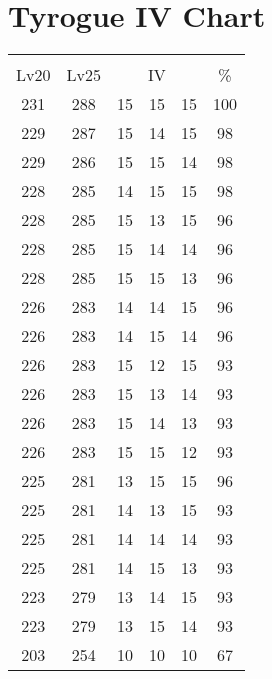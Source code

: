 \documentclass{article}%
\begin{document}
%
\normalsize%
\section{Tyrogue IV Chart}%
\label{sec:Tyrogue IV Chart}%
\renewcommand{\arraystretch}{1.5}%
\begin{tabular}{|c|c|c|c|c|c|}%
\hline%
\multicolumn{6}{|c|}{\textcolor{white}{ 
\linebreak{Tyrogue}
}%
\cellcolor{black}}\\%
\multicolumn{1}{|c}{Lv20}&\multicolumn{1}{c|}{Lv25}&\multicolumn{3}{c|}{IV}&\multicolumn{1}{|c|}{\%}\\%
\hline%
\rowcolor{color100}%
231&288&15&15&15&100\\%
\hline%
\rowcolor{color98}%
229&287&15&14&15&98\\%
\hline%
\rowcolor{color98}%
229&286&15&15&14&98\\%
\hline%
\rowcolor{color98}%
228&285&14&15&15&98\\%
\hline%
\rowcolor{color96}%
228&285&15&13&15&96\\%
\hline%
\rowcolor{color96}%
228&285&15&14&14&96\\%
\hline%
\rowcolor{color96}%
228&285&15&15&13&96\\%
\hline%
\rowcolor{color96}%
226&283&14&14&15&96\\%
\hline%
\rowcolor{color96}%
226&283&14&15&14&96\\%
\hline%
\rowcolor{color93}%
226&283&15&12&15&93\\%
\hline%
\rowcolor{color93}%
226&283&15&13&14&93\\%
\hline%
\rowcolor{color93}%
226&283&15&14&13&93\\%
\hline%
\rowcolor{color93}%
226&283&15&15&12&93\\%
\hline%
\rowcolor{color96}%
225&281&13&15&15&96\\%
\hline%
\rowcolor{color93}%
225&281&14&13&15&93\\%
\hline%
\rowcolor{color93}%
225&281&14&14&14&93\\%
\hline%
\rowcolor{color93}%
225&281&14&15&13&93\\%
\hline%
\rowcolor{color93}%
223&279&13&14&15&93\\%
\hline%
\rowcolor{color93}%
223&279&13&15&14&93\\%
\hline%
\rowcolor{color91}%
203&254&10&10&10&67\\%
\end{tabular}

%
\end{document}
